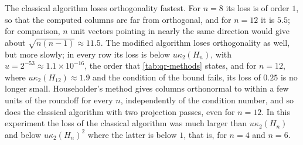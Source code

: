 \begin{table}
\end{table}

The classical algorithm loses orthogonality fastest. For $n=8$ its loss is of order $1$, so that the computed columns are far from orthogonal, and for $n=12$ it is $5.5$; for comparison, $n$ unit vectors pointing in nearly the same direction would give about $\sqrt{n(n-1)}\approx11.5$. The modified algorithm loses orthogonality as well, but more slowly; in every row its loss is below $u\kappa_2(H_n)$, with $u=2^{-53}\approx1.1\times10^{-16}$, the order that \cref{tab:qr-methods} states, and for $n=12$, where $u\kappa_2(H_{12})\approx1.9$ and the condition of the bound fails, its loss of $0.25$ is no longer small. Householder's method gives columns orthonormal to within a few units of the roundoff for every $n$, independently of the condition number, and so does the classical algorithm with two projection passes, even for $n=12$. In this experiment the loss of the classical algorithm was much larger than $u\kappa_2(H_n)$ and below $u\kappa_2(H_n)^2$ where the latter is below $1$, that is, for $n=4$ and $n=6$.


